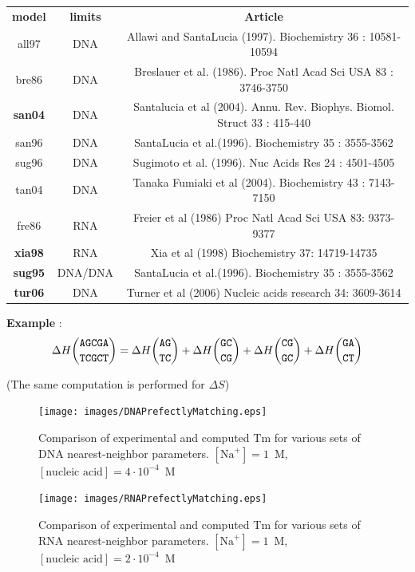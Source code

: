 \documentclass{article}
\begin{document}
\begin{table}[h]
\begin{tabular}[h]{| c | c | c |}
\textbf{model} & \textbf{limits} & \textbf{Article} \\
all97 & DNA & Allawi and SantaLucia (1997). Biochemistry 36 : 10581-10594 \\
bre86 & DNA & Breslauer et al. (1986). Proc Natl Acad Sci USA 83 : 3746-3750 \\
\textbf{san04} & DNA & Santalucia et al (2004). Annu. Rev. Biophys. Biomol. Struct 33 : 415-440 \\
san96 & DNA & SantaLucia et al.(1996). Biochemistry 35 : 3555-3562 \\
sug96 & DNA & Sugimoto et al. (1996). Nuc Acids Res 24 : 4501-4505 \\
tan04 & DNA & Tanaka Fumiaki et al (2004). Biochemistry 43 : 7143-7150  \\
fre86 & RNA & Freier et al (1986) Proc Natl Acad Sci USA 83: 9373-9377 \\
\textbf{xia98} & RNA & Xia et al (1998) Biochemistry 37: 14719-14735 \\
\textbf{sug95} & DNA/DNA & SantaLucia et al.(1996). Biochemistry 35 : 3555-3562 \\
\textbf{tur06} & DNA & Turner et al (2006) Nucleic acids research 34: 3609-3614 \\
\end{tabular}
\end{table}


\textbf{Example} :
\begin{multline*}
\Delta H {\mbox{\texttt{AGCGA}} \choose \mbox{\texttt{TCGCT}}} = 
\Delta H {\mbox{\texttt{AG}} \choose \mbox{\texttt{TC}} } + 
\Delta H {\mbox{\texttt{GC}} \choose \mbox{\texttt{CG}} } +
\Delta H {\mbox{\texttt{CG}} \choose \mbox{\texttt{GC}} } +
\Delta H {\mbox{\texttt{GA}} \choose \mbox{\texttt{CT}} }
\end{multline*}

       (The same computation is performed for $\Delta S$)
       
\begin{figure}[h]
\texttt{[image: images/DNAPrefectlyMatching.eps]}
\caption{Comparison of experimental and computed Tm for various sets of
  DNA nearest-neighbor parameters. $[\mbox{Na}^+] = 1$~M, $[\mbox{nucleic acid}] = 4\cdot{}10^{-4}$~M}
\end{figure}

\begin{figure}[h]
\texttt{[image: images/RNAPrefectlyMatching.eps]}
\caption{Comparison of experimental and computed Tm for various sets of
  RNA nearest-neighbor parameters. $[\mbox{Na}^+] = 1$~M, $[\mbox{nucleic acid}] = 2\cdot{}10^{-4}$~M}
\end{figure}
\end{document}
